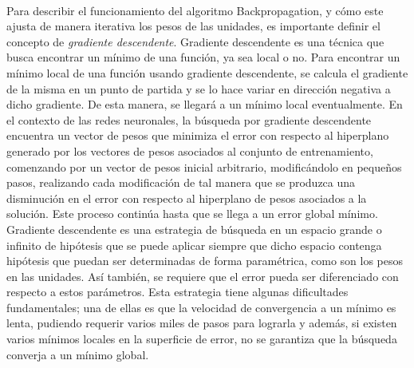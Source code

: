 \paragraph{}Para describir el funcionamiento del algoritmo Backpropagation, y cómo este ajusta de manera iterativa los pesos de las unidades, es importante definir el concepto de \textit{gradiente descendente}.
Gradiente descendente es una técnica que busca encontrar un mínimo de una función, ya sea local o no. 
Para encontrar un mínimo local de una función usando gradiente descendente, se calcula el gradiente de la misma en un punto de partida y se lo hace variar en dirección negativa a dicho gradiente.
De esta manera, se llegará a un mínimo local eventualmente.
En el contexto de las redes neuronales, la búsqueda por gradiente descendente encuentra un vector de pesos que minimiza el error con respecto al hiperplano generado por los vectores de pesos asociados al conjunto de entrenamiento, comenzando por un vector de pesos inicial arbitrario, modificándolo en pequeños pasos, realizando cada modificación de tal manera que se produzca una disminución en el error con respecto al hiperplano de pesos asociados a la solución.
Este proceso continúa hasta que se llega a un error global mínimo.
Gradiente descendente es una estrategia de búsqueda en un espacio grande o infinito de hipótesis que se puede aplicar siempre que dicho espacio contenga hipótesis que puedan ser determinadas de forma paramétrica, como son los pesos en las unidades.
Así también, se requiere que el error pueda ser diferenciado con respecto a estos parámetros.
Esta estrategia tiene algunas dificultades fundamentales; una de ellas es que la velocidad de convergencia a un mínimo es lenta, pudiendo requerir varios miles de pasos para lograrla y además, si existen varios mínimos locales en la superficie de error, no se garantiza que la búsqueda converja a un mínimo global.

